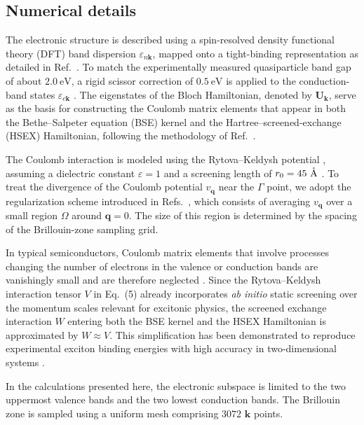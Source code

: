 \documentclass[twocolumn,aps,a4paper,superscriptaddress]{revtex4-2}
\begin{document}
\begin{widetext}
\section{Numerical details}
\label{numapp}
The electronic structure is described using a spin-resolved density functional theory (DFT) band dispersion
$\varepsilon_{n\mathbf{k}}$, mapped onto a tight-binding representation as detailed in Ref.~\cite{PhysRevB.88.085433}.
To match the experimentally measured quasiparticle band gap of about
$2.0~\mathrm{eV}$, a rigid scissor correction of
$0.5~\mathrm{eV}$ is applied to the conduction-band states $\varepsilon_{c\mathbf{k}}$
\cite{PhysRevLett.113.076802,Hsu_2019}.
The eigenstates of the Bloch Hamiltonian, denoted by $\mathbf{U}_{\mathbf{k}}$,
serve as the basis for constructing the Coulomb matrix elements that appear in both the
Bethe–Salpeter equation (BSE) kernel and the Hartree–screened-exchange (HSEX) Hamiltonian,
following the methodology of Ref.~\cite{perfetto_real-time_2023}.

The Coulomb interaction is modeled using the Rytova–Keldysh potential
\cite{keldysh,PhysRevB.84.085406}, assuming a dielectric constant $\varepsilon = 1$
and a screening length of
$r_0 = 45~\mathring{\rm A}$ \cite{stier_magnetooptics_2018}.
To treat the divergence of the Coulomb potential $v_{\mathbf{q}}$ near the $\Gamma$ point,
we adopt the regularization scheme introduced in Refs.~\cite{PhysRevB.88.245309,PhysRevB.97.205409},
which consists of averaging $v_{\mathbf{q}}$ over a small region $\Omega$ around $\mathbf{q}=0$.
The size of this region is determined by the spacing of the Brillouin-zone sampling grid.

In typical semiconductors, Coulomb matrix elements that involve processes changing the number of electrons
in the valence or conduction bands are vanishingly small and are therefore neglected
\cite{PhysRevB.93.205145}.
Since the Rytova–Keldysh interaction tensor $V$ in Eq.~(5) already incorporates
\emph{ab initio} static screening over the momentum scales relevant for excitonic physics,
the screened exchange interaction $W$ entering both the BSE kernel and the HSEX Hamiltonian
is approximated by $W \approx V$.
This simplification has been demonstrated to reproduce experimental exciton binding energies
with high accuracy in two-dimensional systems
\cite{steinhoff2,PhysRevLett.113.076802,PhysRevB.88.045318}.

In the calculations presented here, the electronic subspace is limited to the two uppermost valence bands
and the two lowest conduction bands.
The Brillouin zone is sampled using a uniform mesh comprising $3072$ $\mathbf{k}$ points.



\end{widetext}
\end{document}

